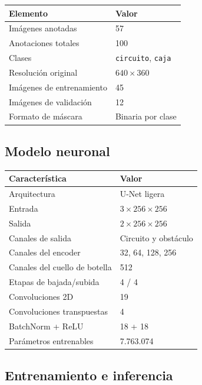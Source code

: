\documentclass{article}
\begin{document}
\begin{table}[h]
\centering
\begin{tabular}{ll}
\toprule
\textbf{Elemento} & \textbf{Valor} \\
\midrule
Im\'agenes anotadas & 57 \\
Anotaciones totales & 100 \\
Clases & \texttt{circuito}, \texttt{caja} \\
Resoluci\'on original & $640 \times 360$ \\
Im\'agenes de entrenamiento & 45 \\
Im\'agenes de validaci\'on & 12 \\
Formato de m\'ascara & Binaria por clase \\
\bottomrule
\end{tabular}
\end{table}

\subsection{Modelo neuronal}

\begin{table}[h]
\centering
\begin{tabular}{ll}
\toprule
\textbf{Caracter\'istica} & \textbf{Valor} \\
\midrule
Arquitectura & U-Net ligera \\
Entrada & $3 \times 256 \times 256$ \\
Salida & $2 \times 256 \times 256$ \\
Canales de salida & Circuito y obst\'aculo \\
Canales del encoder & 32, 64, 128, 256 \\
Canales del cuello de botella & 512 \\
Etapas de bajada/subida & 4 / 4 \\
Convoluciones 2D & 19 \\
Convoluciones transpuestas & 4 \\
BatchNorm + ReLU & 18 + 18 \\
Par\'ametros entrenables & 7.763.074 \\
\bottomrule
\end{tabular}
\end{table}

\subsection{Entrenamiento e inferencia}
\end{document}
